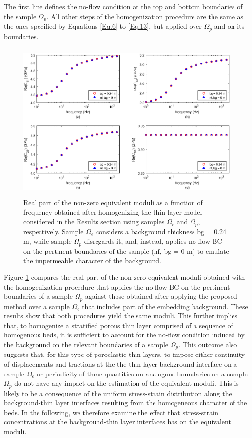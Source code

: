 \documentclass[draft]{agujournal2019}
\begin{document}
The first line defines the no-flow condition at the top and bottom boundaries of the sample $\Omega_p$. All other steps of the homogenization procedure are the same as the ones specified by Equations \eqref{Eq.6} to \eqref{Eq.13}, but applied over $\Omega_p$ and on its boundaries.

\begin{figure}[!ht]
\centering
        \includegraphics[width= 120mm, height=80mm]{Figure5.eps}
\caption{Real part of the non-zero equivalent moduli as a function of frequency obtained after homogenizing the thin-layer model considered in the Results section using samples $\Omega_e$ and  $\Omega_p$, respectively. Sample $\Omega_e$ considers a background thickness bg = 0.24 m, while sample $\Omega_p$ disregards it, and, instead, applies no-flow BC on the pertinent boundaries of the sample (nf, bg = 0 m) to emulate the impermeable character of the background.}
\label{fig.5}
\end{figure}

Figure \ref{fig.5} compares the real part of the non-zero equivalent moduli obtained with the homogenization procedure that applies the no-flow BC on the pertinent boundaries of a sample $\Omega_p$ against those obtained after applying the proposed method over a sample $\Omega_e$ that includes part of the embedding background. These results show that both procedures yield the same moduli. This further implies that, to homogenize a stratified porous thin layer comprised of a sequence of homogenous beds, it is sufficient to account for the no-flow condition induced by the background on the relevant boundaries of a sample $\Omega_p$. This outcome also suggests that, for this type of poroelastic thin layers, to impose either continuity of displacements and tractions at the the thin-layer-background interface on a sample $\Omega_e$ or periodicity of these quantities on analogous boundaries on a sample $\Omega_p$ do not have any impact on the estimation of the equivalent moduli.
This is likely to be a consequence of the uniform stress-strain distribution along the background-thin layer interfaces resulting from the homogeneous character of the beds. In the following, we therefore examine the effect that stress-strain concentrations at the background-thin layer interfaces has on the equivalent moduli.
\end{document}
